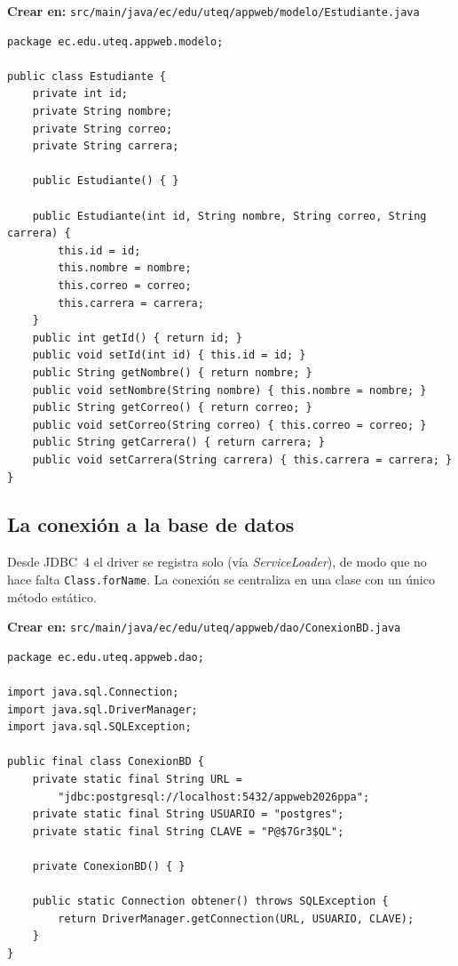 \documentclass[11pt,a4paper,openany]{book}
\begin{document}
{\small\textbf{Crear en:} \texttt{src/main/java/ec/edu/uteq/appweb/modelo/Estudiante.java}}
\begin{lstlisting}[style=java,caption={Estudiante.java (JavaBean del dominio)},label={lst:jsp-modelo}]
package ec.edu.uteq.appweb.modelo;

public class Estudiante {
    private int id;
    private String nombre;
    private String correo;
    private String carrera;

    public Estudiante() { }

    public Estudiante(int id, String nombre, String correo, String carrera) {
        this.id = id;
        this.nombre = nombre;
        this.correo = correo;
        this.carrera = carrera;
    }
    public int getId() { return id; }
    public void setId(int id) { this.id = id; }
    public String getNombre() { return nombre; }
    public void setNombre(String nombre) { this.nombre = nombre; }
    public String getCorreo() { return correo; }
    public void setCorreo(String correo) { this.correo = correo; }
    public String getCarrera() { return carrera; }
    public void setCarrera(String carrera) { this.carrera = carrera; }
}
\end{lstlisting}

\subsection{La conexión a la base de datos}
\label{ap:crud:jsp:conexion}

Desde JDBC~4 el driver se registra solo (vía \emph{ServiceLoader}), de
modo que no hace falta \texttt{Class.forName}. La conexión se centraliza
en una clase con un único método estático.

{\small\textbf{Crear en:} \texttt{src/main/java/ec/edu/uteq/appweb/dao/ConexionBD.java}}
\begin{lstlisting}[style=java,caption={ConexionBD.java (conexion JDBC centralizada)},label={lst:jsp-conexion}]
package ec.edu.uteq.appweb.dao;

import java.sql.Connection;
import java.sql.DriverManager;
import java.sql.SQLException;

public final class ConexionBD {
    private static final String URL =
        "jdbc:postgresql://localhost:5432/appweb2026ppa";
    private static final String USUARIO = "postgres";
    private static final String CLAVE = "P@$7Gr3$QL";

    private ConexionBD() { }

    public static Connection obtener() throws SQLException {
        return DriverManager.getConnection(URL, USUARIO, CLAVE);
    }
}
\end{lstlisting}
\end{document}
